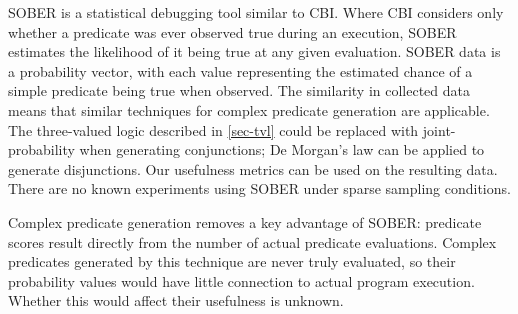 SOBER \cite{1081753} is a statistical debugging tool similar to CBI\@.  Where CBI considers only whether a predicate was ever observed true during an execution, SOBER estimates the likelihood of it being true at any given evaluation.  SOBER data is a probability vector, with each value representing the estimated chance of a simple predicate being true when observed.  The similarity in collected data means that similar techniques for complex predicate generation are applicable.  The three-valued logic described in \autoref{sec-tvl} could be replaced with joint-probability when generating conjunctions; De Morgan's law can be applied to generate disjunctions.  Our usefulness metrics can be used on the resulting data.  There are no known experiments using SOBER under sparse sampling conditions.

Complex predicate generation removes a key advantage of SOBER: predicate scores result directly from the number of actual predicate evaluations.  Complex predicates generated by this technique are never truly evaluated, so their probability values would have little connection to actual program execution.  Whether this would affect their usefulness is unknown.

